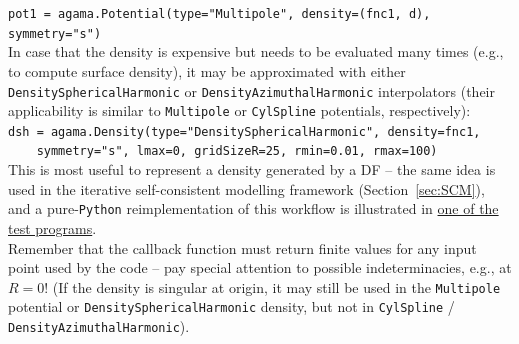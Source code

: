 \documentclass[12pt]{article}
\newcommand{\Python}{\texttt{Python}\xspace}
\newcommand{\ppp}[1]{\textcolor{darkolive} {\texttt{#1}}}
\begin{document}
\texttt{pot1 = agama.Potential(type="Multipole", density=(fnc1, d), symmetry="s")}\\[2mm]
In case that the density is expensive but needs to be evaluated many times (e.g., to compute surface density), it may be approximated with either \ppp{DensitySphericalHarmonic} or \ppp{DensityAzimuthalHarmonic} interpolators (their applicability is similar to \ppp{Multipole} or \ppp{CylSpline} potentials, respectively): \\
\texttt{dsh = agama.Density(type="DensitySphericalHarmonic", density=fnc1, \\
\mbox{}~~~~symmetry="s", lmax=0, gridSizeR=25, rmin=0.01, rmax=100)}\\
This is most useful to represent a density generated by a DF -- the same idea is used in the iterative self-consistent modelling framework (Section~\ref{sec:SCM}), and a pure-\Python reimplementation of this workflow is illustrated in \hyperref[sec:ExampleSCM]{one of the test programs}.\\[2mm]
Remember that the callback function must return finite values for any input point used by the code -- pay special attention to possible indeterminacies, e.g., at $R=0$! (If the density is singular at origin, it may still be used in the \ppp{Multipole} potential or \ppp{DensitySphericalHarmonic} density, but not in \ppp{CylSpline} / \ppp{DensityAzimuthalHarmonic}).
\end{document}

